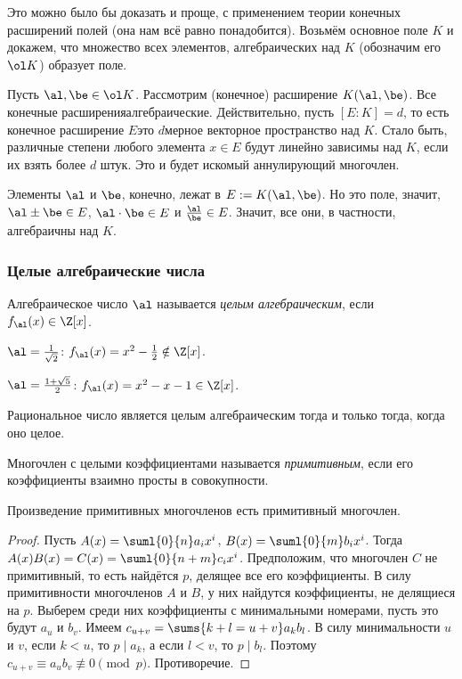 \documentclass[a4paper]{article}
\def\nequiv{\not\equiv}
\begin{document}
\begin{petit}
Это можно было бы доказать и проще, с применением теории конечных расширений полей (она нам всё равно понадобится).
Возьмём основное поле $K$ и докажем, что множество всех элементов, алгебраических над $K$ (обозначим его $\ol K$)
образует поле.

Пусть $\al, \be \in \ol K$. Рассмотрим (конечное) расширение $K(\al, \be)$. Все конечные расширения\т алгебраические.
Действительно, пусть $[E:K] =d$, то есть конечное расширение $E$\т это $d$\д мерное векторное пространство над $K$.
Стало быть, различные степени любого элемента $x \in E$ будут линейно зависимы над $K$, если их взять более $d$ штук.
Это и будет искомый аннулирующий многочлен.

Элементы $\al$ и $\be$, конечно, лежат в $E:=K(\al,\be)$. Но это поле, значит, $\al\pm \be \in E$, $\al\cdot \be \in E$
и $\frac{\al}{\be} \in E$. Значит, все они, в частности, алгебраичны над $K$.
\end{petit}


\subsubsection{Целые алгебраические числа}

\begin{df}
Алгебраическое число $\al$ называется \emph{целым алгебраическим}, если $f_{\al}(x)\in\Z[x]$.
\end{df}

\begin{ex}
$\al=\frac1{\sqrt{2}}$: $f_{\al}(x)=x^2-\frac12\notin\Z[x]$.
\end{ex}

\begin{ex}
$\al=\frac{1+\sqrt{5}}2$: $f_{\al}(x)=x^2-x-1\in\Z[x]$.
\end{ex}

\begin{ex}
Рациональное число является целым алгебраическим тогда и только тогда, когда оно целое.
\end{ex}

\begin{df}
Многочлен с целыми коэффициентами называется \emph{примитивным}, если его коэффициенты взаимно просты в совокупности.
\end{df}

\begin{lemma}[Гаусс]
Произведение примитивных многочленов есть примитивный многочлен.
\end{lemma}
\begin{proof}
Пусть $A(x)=\suml{0}{n}a_ix^i$, $B(x)=\suml{0}{m}b_ix^i$. Тогда $A(x)B(x)=C(x)=\suml{0}{n+m}c_ix^i$. Предположим, что
многочлен $C$ не примитивный, то есть найдётся $p$, делящее все его коэффициенты.
В силу примитивности многочленов $A$ и $B$, у них найдутся коэффициенты, не делящиеся на $p$.
Выберем среди них коэффициенты с минимальными номерами, пусть это будут $a_u$ и $b_v$.
Имеем $c_{u+v}=\sums{k+l=u+v}a_kb_l$. В силу минимальности $u$ и $v$, если $k<u$, то $p\mid a_k$, а если
$l<v$, то $p\mid b_l$. Поэтому $c_{u+v}\equiv a_ub_v\nequiv0\pmod{p}$. Противоречие.
\end{proof}
\end{document}

